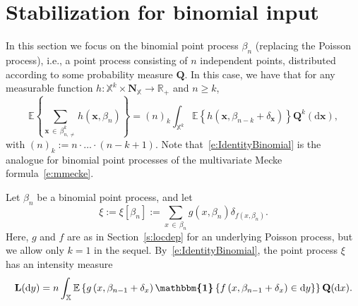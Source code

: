 \documentclass[10pt]{amsart}
\theoremstyle{definition}\newtheorem{defi}[theo]{Definition}\newtheorem{rema}[theo]{Remark}\newtheorem{exam}[theo]{Example}\newtheorem{exem}[theo]{Example}\newtheorem{nota}[theo]{Notation}
\newcommand*\bL{\mathbf{L}}
\newcommand*\bN{\mathbf{N}}
\newcommand{\bx}{\mathbf{x}}
\newcommand{\bQ}{\mathbf{Q}}
\newcommand*\R{\mathbb{R}}
\newcommand*\X{\mathbb{X}}
\newcommand{\E}{\mathbb{E}}
\newcommand*\md{\mathrm{d}}
\newcommand{\mean}[1] {\E\left\{{#1}\right\}}
\newcommand{\ind}{\boldsymbol{\mathbbm{1}}}
\begin{document}
\section{Stabilization for binomial input}\label{s:locdep_binomial}

In this section we focus on the binomial {point} process $\beta_n$ (replacing the Poisson process), i.e., a point process consisting of $n$ independent points, distributed according to some probability measure $\bQ$. In this case, we have that for any measurable function $h: \X^k \times \bN_{\X}\to\R_+$ and $n\geq k$,
\begin{equation}\label{e:IdentityBinomial}
\mean{\sum_{\bx\,\in\,\beta^k_{n,\ne}} h(\bx,\beta_n)} = (n)_k \int_{\X^k}\mean{h\left(\bx,\beta_{n-k}+\delta_{\bx}\right)}\bQ^k(\md \bx),
\end{equation}
with $(n)_k:=n\cdot\hdots\cdot (n-k+1)$. Note that~\eqref{e:IdentityBinomial} is the analogue for binomial point processes of the multivariate Mecke formula~\eqref{e:mmecke}.

Let $\beta_n$ be a binomial point process, and let
\[
\xi:= {\xi\left[\beta_n\right] :=} \sum_{x\,\in\,\beta_n} g(x,\beta_n) \delta_{f\left(x,\beta_n\right)}.
\]
Here, $g$ and $f$ are as in Section~\ref{s:locdep} for an underlying Poisson process, but we allow only $k=1$ in the sequel. By~\eqref{e:IdentityBinomial}, the point process $\xi$ has an intensity measure
\begin{equation}\label{e:IntensityMeasureBinomial}
\bL({\md y})= n \int_{\X} \mean{g\left(x,\beta_{n-1}+\delta_x\right) \ind\left\{f\left(x,\beta_{n-1}+\delta_x\right)\in \md y\right\}} \bQ(\md x).
\end{equation}
\end{document}

